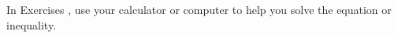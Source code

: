 {\noindent  In Exercises}
{, use your calculator or computer to help you solve the equation or  inequality.}
